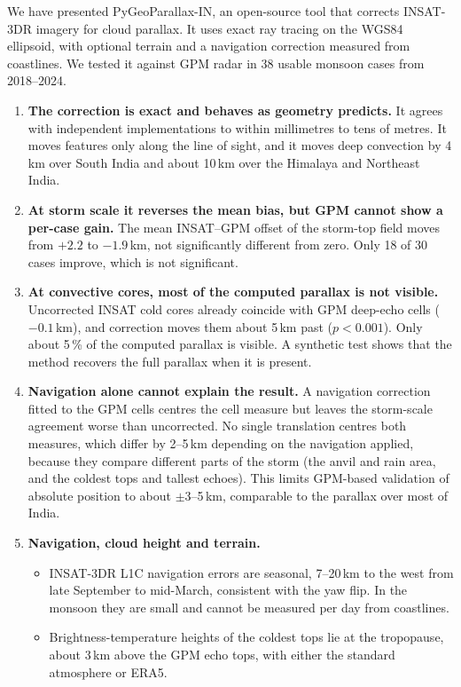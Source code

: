 \conclusions
\label{sec:conclusions}

We have presented PyGeoParallax-IN, an open-source tool that corrects INSAT-3DR imagery for cloud parallax. It uses exact ray tracing on the WGS84 ellipsoid, with optional terrain and a navigation correction measured from coastlines. We tested it against GPM radar in 38 usable monsoon cases from 2018--2024.

\begin{enumerate}
  \item \textbf{The correction is exact and behaves as geometry predicts.} It agrees with independent implementations to within millimetres to tens of metres. It moves features only along the line of sight, and it moves deep convection by 4\,km over South India and about 10\,km over the Himalaya and Northeast India.
  \item \textbf{At storm scale it reverses the mean bias, but GPM cannot show a per-case gain.} The mean INSAT--GPM offset of the storm-top field moves from $+2.2$ to $-1.9$\,km, not significantly different from zero. Only 18 of 30 cases improve, which is not significant.
  \item \textbf{At convective cores, most of the computed parallax is not visible.} Uncorrected INSAT cold cores already coincide with GPM deep-echo cells ($-0.1$\,km), and correction moves them about 5\,km past ($p<0.001$). Only about 5\,\% of the computed parallax is visible. A synthetic test shows that the method recovers the full parallax when it is present.
  \item \textbf{Navigation alone cannot explain the result.} A navigation correction fitted to the GPM cells centres the cell measure but leaves the storm-scale agreement worse than uncorrected. No single translation centres both measures, which differ by 2--5\,km depending on the navigation applied, because they compare different parts of the storm (the anvil and rain area, and the coldest tops and tallest echoes). This limits GPM-based validation of absolute position to about $\pm$3--5\,km, comparable to the parallax over most of India.
  \item \textbf{Navigation, cloud height and terrain.}
  \begin{itemize}
    \item INSAT-3DR L1C navigation errors are seasonal, 7--20\,km to the west from late September to mid-March, consistent with the yaw flip. In the monsoon they are small and cannot be measured per day from coastlines.
    \item Brightness-temperature heights of the coldest tops lie at the tropopause, about 3\,km above the GPM echo tops, with either the standard atmosphere or ERA5.

\end{itemize}
\end{enumerate}
